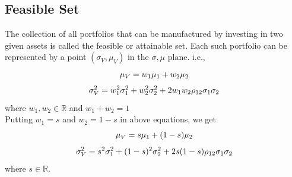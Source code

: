 \subsection{Feasible Set}
The collection of all portfolios that can be manufactured by investing in two given assets is called the feasible or attainable set. Each such portfolio can be represented by a point $(\sigma_{V},\mu_{V})$ in the $\sigma,\mu$ plane.
i.e., 
\begin{equation}
    \mu_{V}=w_{1}\mu_{1} + w_{2}\mu_{2}\\
\end{equation}
\begin{equation}
    \sigma_{V}^{2} = w_{1}^2\sigma_{1}^{2}+w_{2}^2\sigma_{2}^{2}+2w_{1}w_{2}\rho_{12}\sigma_{1}\sigma_{2}\\
\end{equation}
where $w_{1}, w_{2} \in \mathbb{R}$ and $w_{1}+w_{2}=1$\\
Putting $w_{1}=s$ and $w_{2}=1-s$ in above equations, we get \-
\begin{equation}
    \mu_{V}=s\mu_{1} + (1-s)\mu_{2}\\
\end{equation}
\begin{equation}
    \sigma_{V}^{2} = s^2\sigma_{1}^{2}+(1-s)^2\sigma_{2}^{2}+2s(1-s)\rho_{12}\sigma_{1}\sigma_{2}\\
\end{equation}
where $s \in \mathbb{R}.$

